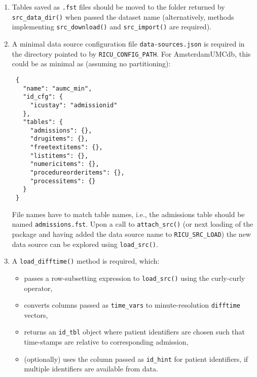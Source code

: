 \documentclass[
  notitle,
  nojss,
  noheadings]{jss}
\providecommand{\tightlist}{%
  \setlength{\itemsep}{0pt}\setlength{\parskip}{0pt}}
\begin{document}
\begin{enumerate}
\def\labelenumi{\arabic{enumi}.}
\item
  Tables saved as \texttt{.fst} files should be moved to the folder
  returned by \texttt{src\_data\_dir()} when passed the dataset name
  (alternatively, methods implementing \texttt{src\_download()} and
  \texttt{src\_import()} are required).
\item
  A minimal data source configuration file \texttt{data-sources.json} is
  required in the directory pointed to by \texttt{RICU\_CONFIG\_PATH}.
  For AmsterdamUMCdb, this could be as minimal as (assuming no
  partitioning):

\begin{verbatim}
 {
   "name": "aumc_min",
   "id_cfg": {
     "icustay": "admissionid"
   },
   "tables": {
     "admissions": {},
     "drugitems": {},
     "freetextitems": {},
     "listitems": {},
     "numericitems": {},
     "procedureorderitems": {},
     "processitems": {}
   }
 }
\end{verbatim}

  File names have to match table names, i.e., the admissions table
  should be named \texttt{admissions.fst}. Upon a call to
  \texttt{attach\_src()} (or next loading of the package and having
  added the data source name to \texttt{RICU\_SRC\_LOAD}) the new data
  source can be explored using \texttt{load\_src()}.
\item
  A \texttt{load\_difftime()} method is required, which:

  \begin{itemize}
  \tightlist
  \item
    passes a row-subsetting expression to \texttt{load\_src()} using the
     curly-curly operator,
  \item
    converts columns passed as \texttt{time\_vars} to minute-resolution
    \texttt{difftime} vectors,
  \item
    returns an \texttt{id\_tbl} object where patient identifiers are
    chosen such that time-stamps are relative to corresponding
    admission,
  \item
    (optionally) uses the column passed as \texttt{id\_hint} for patient
    identifiers, if multiple identifiers are available from data.
  \end{itemize}


\end{enumerate}
\end{document}
